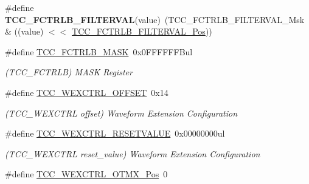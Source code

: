 \begin{DoxyCompactItemize}
\item 
\hypertarget{group___s_a_m_l21___t_c_c_gafd07f0fe69e6f8823875c4f8ffd995d5}{}\#define {\bfseries T\+C\+C\+\_\+\+F\+C\+T\+R\+L\+B\+\_\+\+F\+I\+L\+T\+E\+R\+V\+A\+L}(value)~(T\+C\+C\+\_\+\+F\+C\+T\+R\+L\+B\+\_\+\+F\+I\+L\+T\+E\+R\+V\+A\+L\+\_\+\+Msk \& ((value) $<$$<$ \hyperlink{group___s_a_m_l21___t_c_c_gaf826336f218fb5af54f6233ddae07dc6}{T\+C\+C\+\_\+\+F\+C\+T\+R\+L\+B\+\_\+\+F\+I\+L\+T\+E\+R\+V\+A\+L\+\_\+\+Pos}))\label{group___s_a_m_l21___t_c_c_gafd07f0fe69e6f8823875c4f8ffd995d5}

\item 
\hypertarget{group___s_a_m_l21___t_c_c_gab88ff9362b11dfbf578de2122dae9e3e}{}\#define \hyperlink{group___s_a_m_l21___t_c_c_gab88ff9362b11dfbf578de2122dae9e3e}{T\+C\+C\+\_\+\+F\+C\+T\+R\+L\+B\+\_\+\+M\+A\+S\+K}~0x0\+F\+F\+F\+F\+F\+F\+Bul\label{group___s_a_m_l21___t_c_c_gab88ff9362b11dfbf578de2122dae9e3e}

\begin{DoxyCompactList}\small\item\em (T\+C\+C\+\_\+\+F\+C\+T\+R\+L\+B) M\+A\+S\+K Register \end{DoxyCompactList}\item 
\hypertarget{group___s_a_m_l21___t_c_c_gaac74f249271b8dc70ebe8db9ff3ca33e}{}\#define \hyperlink{group___s_a_m_l21___t_c_c_gaac74f249271b8dc70ebe8db9ff3ca33e}{T\+C\+C\+\_\+\+W\+E\+X\+C\+T\+R\+L\+\_\+\+O\+F\+F\+S\+E\+T}~0x14\label{group___s_a_m_l21___t_c_c_gaac74f249271b8dc70ebe8db9ff3ca33e}

\begin{DoxyCompactList}\small\item\em (T\+C\+C\+\_\+\+W\+E\+X\+C\+T\+R\+L offset) Waveform Extension Configuration \end{DoxyCompactList}\item 
\hypertarget{group___s_a_m_l21___t_c_c_gadaea0df62faeff78efb35f9856209f42}{}\#define \hyperlink{group___s_a_m_l21___t_c_c_gadaea0df62faeff78efb35f9856209f42}{T\+C\+C\+\_\+\+W\+E\+X\+C\+T\+R\+L\+\_\+\+R\+E\+S\+E\+T\+V\+A\+L\+U\+E}~0x00000000ul\label{group___s_a_m_l21___t_c_c_gadaea0df62faeff78efb35f9856209f42}

\begin{DoxyCompactList}\small\item\em (T\+C\+C\+\_\+\+W\+E\+X\+C\+T\+R\+L reset\+\_\+value) Waveform Extension Configuration \end{DoxyCompactList}\item 
\hypertarget{group___s_a_m_l21___t_c_c_gaf2eb4848370cc8e8d3fd8823bc871d2c}{}\#define \hyperlink{group___s_a_m_l21___t_c_c_gaf2eb4848370cc8e8d3fd8823bc871d2c}{T\+C\+C\+\_\+\+W\+E\+X\+C\+T\+R\+L\+\_\+\+O\+T\+M\+X\+\_\+\+Pos}~0\label{group___s_a_m_l21___t_c_c_gaf2eb4848370cc8e8d3fd8823bc871d2c}


\end{DoxyCompactItemize}
